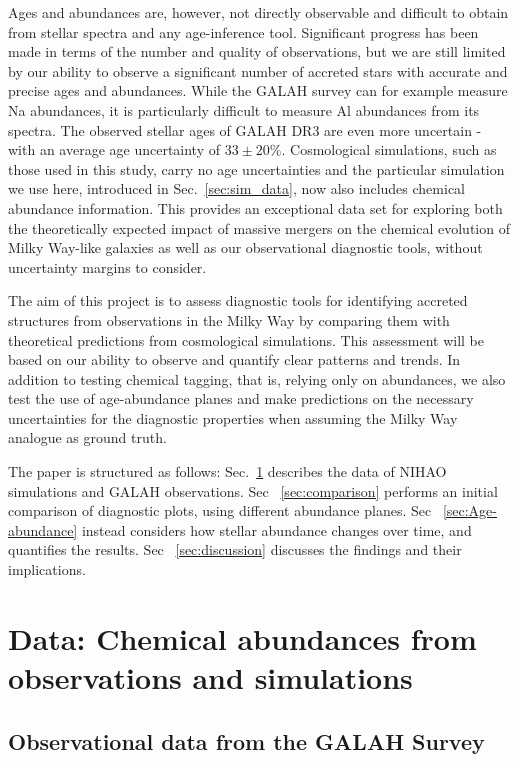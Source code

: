 \documentclass[fleqn,usenatbib]{mnras}
\begin{document}
Ages and abundances are, however, not directly observable and difficult to obtain from stellar spectra and any age-inference tool. Significant progress has been made in terms of the number and quality of observations, but we are still limited by our ability to observe a significant number of accreted stars with accurate and precise ages and abundances. While the GALAH survey can for example measure Na abundances, it is particularly difficult to measure Al abundances from its spectra. The observed stellar ages of GALAH DR3 are even more uncertain - with an average age uncertainty of $33\pm20\%$. Cosmological simulations, such as those used in this study, carry no age uncertainties and the particular simulation \citep{Buck2021} we use here, introduced in Sec.~\ref{sec:sim_data}, now also includes chemical abundance information. This provides an exceptional data set for exploring both the theoretically expected impact of massive mergers on the chemical evolution of Milky Way-like galaxies \citep{Buck2023} as well as our observational diagnostic tools, without uncertainty margins to consider.

The aim of this project is to assess diagnostic tools for identifying accreted structures from observations in the Milky Way by comparing them with theoretical predictions from cosmological simulations. This assessment will be based on our ability to observe and quantify clear patterns and trends. In addition to testing chemical tagging, that is, relying only on abundances, we also test the use of age-abundance planes and make predictions on the necessary uncertainties for the diagnostic properties when assuming the Milky Way analogue as ground truth.

The paper is structured as follows: Sec.~\ref{sec:data} describes the data of NIHAO simulations and GALAH observations. Sec ~\ref{sec:comparison} performs an initial comparison of diagnostic plots, using different abundance planes. Sec ~\ref{sec:Age-abundance} instead considers how stellar abundance changes over time, and quantifies the results. Sec ~\ref{sec:discussion} discusses the findings and their implications.

\section{Data: Chemical abundances from observations and simulations} \label{sec:data}

\subsection{Observational data from the GALAH Survey}\label{sec:obs_data}
\end{document}
